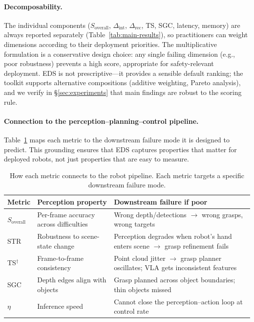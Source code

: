 \paragraph{Decomposability.}
The individual components ($S_\text{overall}$, $\Delta_\text{int}$, $\Delta_\text{rec}$, TS, SGC, latency, memory) are always reported separately (Table~\ref{tab:main-results}), so practitioners can weight dimensions according to their deployment priorities.
The multiplicative formulation is a conservative design choice: any single failing dimension (e.g., poor robustness) prevents a high score, appropriate for safety-relevant deployment.
EDS is not prescriptive---it provides a sensible default ranking; the toolkit supports alternative compositions (additive weighting, Pareto analysis), and we verify in \S\ref{sec:experiments} that main findings are robust to the scoring rule.

\paragraph{Connection to the perception--planning--control pipeline.}
Table~\ref{tab:metric-pipeline} maps each \coolname{} metric to the downstream failure mode it is designed to predict.
This grounding ensures that EDS captures properties that matter for deployed robots, not just properties that are easy to measure.

\begin{table}[h]
\centering
\caption{How each \coolname{} metric connects to the robot pipeline. Each metric targets a specific downstream failure mode.}
\label{tab:metric-pipeline}
\small
\begin{tabular}{p{1.5cm}p{4.5cm}p{6.5cm}}
\toprule
\textbf{Metric} & \textbf{Perception property} & \textbf{Downstream failure if poor} \\
\midrule
$S_{\text{overall}}$ & Per-frame accuracy across difficulties & Wrong depth/detections $\to$ wrong grasps, wrong targets \\
STR & Robustness to scene-state change & Perception degrades when robot's hand enters scene $\to$ grasp refinement fails \\
TS$^\dagger$ & Frame-to-frame consistency & Point cloud jitter $\to$ grasp planner oscillates; VLA gets inconsistent features \\
SGC & Depth edges align with objects & Grasp planned across object boundaries; thin objects missed \\
$\eta$ & Inference speed & Cannot close the perception--action loop at control rate \\
\bottomrule
\end{tabular}
\end{table}

